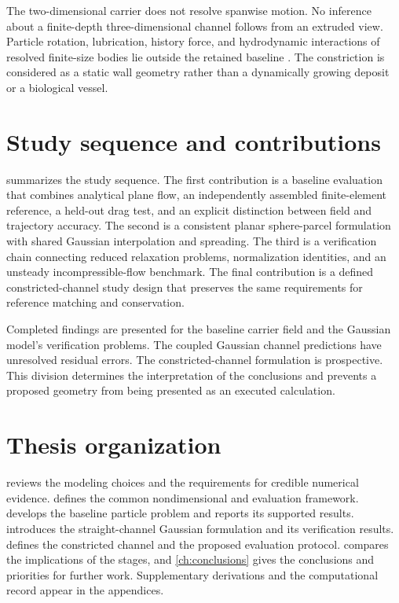 The two-dimensional carrier does not resolve spanwise motion. No inference
about a finite-depth three-dimensional channel follows from an extruded
view. Particle rotation, lubrication, history force, and hydrodynamic
interactions of resolved finite-size bodies lie outside the retained
baseline \citep{maxey1983,goldman1967,brenner1961}. %
 The constriction is considered as a static wall geometry rather
than a dynamically growing deposit or a biological vessel.

\section{Study sequence and contributions}
 summarizes the study sequence. The first contribution is a
baseline evaluation that combines analytical plane flow, an independently
assembled finite-element reference, a held-out drag test, and an explicit
distinction between field and trajectory accuracy. The second is a
consistent planar sphere-parcel formulation with shared Gaussian
interpolation and spreading. The third is a verification chain connecting
reduced relaxation problems, normalization identities, and an unsteady
incompressible-flow benchmark. The final contribution is a defined
constricted-channel study design that preserves the same requirements for
reference matching and conservation.

Completed findings are presented for the baseline carrier field and the
Gaussian model's verification problems. The coupled Gaussian channel
predictions have unresolved residual errors. The constricted-channel
formulation is prospective. This division determines the interpretation of
the conclusions and prevents a proposed geometry from being presented as
an executed calculation.


\section{Thesis organization}
 reviews the modeling choices and the requirements for
credible numerical evidence.  defines the common
nondimensional and evaluation framework.  develops the
baseline particle problem and reports its supported results.
 introduces the straight-channel Gaussian formulation and
its verification results.  defines the constricted
channel and the proposed evaluation protocol.  compares
the implications of the stages, and \cref{ch:conclusions} gives the
conclusions and priorities for further work. Supplementary derivations and
the computational record appear in the appendices.
